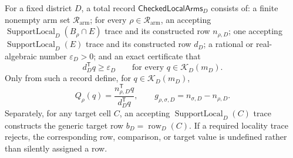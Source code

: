 For a fixed district \(D\), a total record \(\mathsf{CheckedLocalArms}_D\) consists of: a finite nonempty arm set \(\mathcal R_{\mathrm{arm}}\); for every \(\rho\in\mathcal R_{\mathrm{arm}}\), an accepting \(\operatorname{SupportLocal}_D(B_\rho\cap E)\) trace and its constructed row \(n_{\rho,D}\); one accepting \(\operatorname{SupportLocal}_D(E)\) trace and its constructed row \(d_D\); a rational or real-algebraic number \(\varepsilon_D>0\); and an exact certificate that
\[
d_D^{\mathsf T}q\geq\varepsilon_D
\qquad\text{for every }q\in\mathcal K_D(m_D).
\]
Only from such a record define, for \(q\in\mathcal K_D(m_D)\),
\[
Q_\rho(q)=\frac{n_{\rho,D}^{\mathsf T}q}{d_D^{\mathsf T}q},
\qquad
g_{\rho,\sigma,D}=n_{\sigma,D}-n_{\rho,D}.
\]
Separately, for any target cell \(C\), an accepting \(\operatorname{SupportLocal}_D(C)\) trace constructs the generic target row \(b_D=\operatorname{row}_D(C)\).  If a required locality trace rejects, the corresponding row, comparison, or target value is undefined rather than silently assigned a row.